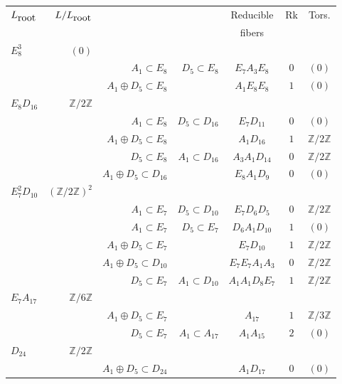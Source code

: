 \documentclass{amsart}
\begin{document}
\begin{table}
\begin{center}
\begin{tabular}{|l|r|r|r|c|c|c|}
\hline
$L_{\hbox{root}}$ & $L/L_{\hbox{root}}$ &  & & \hbox{Reducible} & \hbox{Rk} & \hbox{Tors.} \\
    &  &    &  & \hbox{fibers} &   &  \\  \hline          \hline
  $E_8^3$    &  $(0)$ & & & & &\\ \hline
&   & $A_1\subset E_8$ & $D_5 \subset E_8$  & $E_7 A_3 E_8$ & $0$ & $(0)$\\ \hline
&   & $A_1\oplus D_5 \subset E_8$ &   & $A_1 E_8  E_8$ & $1$ & $(0)$\\ \hline
  $E_8 D_{16}$    &  $\mathbb Z /{2 \mathbb Z}$ & & & & &\\ \hline
&   & $A_1\subset E_8$ & $D_5 \subset D_{16}$  & $E_7 D_{11}$ & $0$ & $(0)$\\ \hline
&   & $A_1\oplus D_5 \subset E_8$ &   & $A_1 D_{16}$ & $1$ & $\mathbb Z /{2 \mathbb Z}$\\ \hline
&   & $D_5\subset E_8$ & $A_1 \subset D_{16}$  & $A_3 A_1 D_{14}$ & $0$ & $\mathbb Z /{2 \mathbb Z}$\\ \hline
&   & $A_1\oplus D_5 \subset D_{16}$ &   & $E_8 A_1 D_{9}$ & $0$ & $(0)$\\ \hline
  $E_7^2 D_{10}$    &  $(\mathbb Z /{2 \mathbb Z})^2$ & & & & &\\ \hline
&   & $A_1\subset E_7$ & $D_5 \subset D_{10}$  & $E_7 D_6 D_5$ & $0$ & $\mathbb Z /{2 \mathbb Z}$\\ \hline
&   & $A_1\subset E_7$ & $D_5 \subset E_7$  & $ D_6 A_1 D_{10}$ &$1$ & $(0)$\\ \hline
&   & $A_1\oplus D_5 \subset E_7$ &   & $E_7 D_{10}$ & $1$ & $\mathbb Z /{2 \mathbb Z}$\\ \hline
&   & $A_1\oplus D_5 \subset D_{10}$ &   & $E_7 E_7 A_1 A_3$ & $0$ & $\mathbb Z /{2 \mathbb Z}$\\ \hline
&   & $D_5\subset E_7$ & $A_1 \subset D_{10}$  & $A_1 A_1 D_8 E_7$ & $1$ & $\mathbb Z /{2 \mathbb Z}$\\ \hline
 $E_7 A_{17}$    &  $\mathbb Z /{6 \mathbb Z}$ & & & & &\\ \hline
&   & $A_1\oplus D_5 \subset E_7$ &   & $A_{17}$ & $1$ & $\mathbb Z /{3 \mathbb Z}$\\ \hline
&   & $D_5\subset E_7$ & $A_1 \subset A_{17}$  & $A_1 A_{15}$ & $2$ & $(0)$\\ \hline
 $D_{24}$    &  $\mathbb Z /{2 \mathbb Z}$ & & & & &\\ \hline
&   & $A_1\oplus D_5 \subset D_{24}$ &   & $A_1 D_{17}$ & $0$ & $(0)$\\ \hline


\end{tabular}
\end{center}
\end{table}
\end{document}
